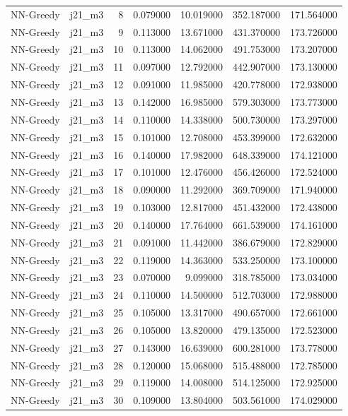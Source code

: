 \begin{tabular}{llrrrrr}
NN-Greedy & j21_m3 & 8 & 0.079000 & 10.019000 & 352.187000 & 171.564000 \\
NN-Greedy & j21_m3 & 9 & 0.113000 & 13.671000 & 431.370000 & 173.726000 \\
NN-Greedy & j21_m3 & 10 & 0.113000 & 14.062000 & 491.753000 & 173.207000 \\
NN-Greedy & j21_m3 & 11 & 0.097000 & 12.792000 & 442.907000 & 173.130000 \\
NN-Greedy & j21_m3 & 12 & 0.091000 & 11.985000 & 420.778000 & 172.938000 \\
NN-Greedy & j21_m3 & 13 & 0.142000 & 16.985000 & 579.303000 & 173.773000 \\
NN-Greedy & j21_m3 & 14 & 0.110000 & 14.338000 & 500.730000 & 173.297000 \\
NN-Greedy & j21_m3 & 15 & 0.101000 & 12.708000 & 453.399000 & 172.632000 \\
NN-Greedy & j21_m3 & 16 & 0.140000 & 17.982000 & 648.339000 & 174.121000 \\
NN-Greedy & j21_m3 & 17 & 0.101000 & 12.476000 & 456.426000 & 172.524000 \\
NN-Greedy & j21_m3 & 18 & 0.090000 & 11.292000 & 369.709000 & 171.940000 \\
NN-Greedy & j21_m3 & 19 & 0.103000 & 12.817000 & 451.432000 & 172.438000 \\
NN-Greedy & j21_m3 & 20 & 0.140000 & 17.764000 & 661.539000 & 174.161000 \\
NN-Greedy & j21_m3 & 21 & 0.091000 & 11.442000 & 386.679000 & 172.829000 \\
NN-Greedy & j21_m3 & 22 & 0.119000 & 14.363000 & 533.250000 & 173.100000 \\
NN-Greedy & j21_m3 & 23 & 0.070000 & 9.099000 & 318.785000 & 173.034000 \\
NN-Greedy & j21_m3 & 24 & 0.110000 & 14.500000 & 512.703000 & 172.988000 \\
NN-Greedy & j21_m3 & 25 & 0.105000 & 13.317000 & 490.657000 & 172.661000 \\
NN-Greedy & j21_m3 & 26 & 0.105000 & 13.820000 & 479.135000 & 172.523000 \\
NN-Greedy & j21_m3 & 27 & 0.143000 & 16.639000 & 600.281000 & 173.778000 \\
NN-Greedy & j21_m3 & 28 & 0.120000 & 15.068000 & 515.488000 & 172.785000 \\
NN-Greedy & j21_m3 & 29 & 0.119000 & 14.008000 & 514.125000 & 172.925000 \\
NN-Greedy & j21_m3 & 30 & 0.109000 & 13.804000 & 503.561000 & 174.029000 \\

\end{tabular}
